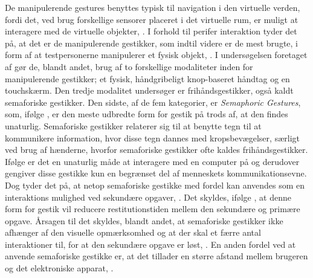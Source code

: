 De manipulerende gestures benyttes typisk til navigation i den virtuelle verden, fordi det, ved brug forskellige sensorer placeret i det virtuelle rum, er muligt at interagere med de virtuelle objekter, \parencite[ss. 14-15]{PDF:ATaxonomyOfGestures}. I forhold til perifer interaktion tyder det på, at det er de manipulerende gestikker, som indtil videre er de mest brugte, i form af at testpersonerne manipulerer et fysisk objekt, \parencite[s. 164]{PDF:ComparingInputModalities}. I undersøgelsen foretaget af \textcite[ss. 164-165]{PDF:ComparingInputModalities} gør de, blandt andet, brug af to forskellige modaliteter inden for manipulerende gestikker; et fysisk, håndgribeligt knop-baseret håndtag og en touchskærm. Den tredje modalitet \textcite[s. 165]{PDF:ComparingInputModalities} undersøger er frihåndsgestikker, også kaldt semaforiske gestikker.\blankline
%
Den sidste, af de fem kategorier, er \textit{Semaphoric Gestures}, som, ifølge \textcite[s. 6]{PDF:ATaxonomyOfGestures}, er den meste udbredte form for gestik på trods af, at den findes unaturlig. Semaforiske gestikker relaterer sig til at benytte tegn til at kommunikere information, hvor disse tegn dannes med kropsbevægelser, særligt ved brug af hænderne, hvorfor semaforiske gestikker ofte kaldes frihåndsgestikker. Ifølge \textcite[s. 1961]{PDF:AStudyOnTheUseOfSemaphoricGestures} er det en unaturlig måde at interagere med en computer på og derudover gengiver disse gestikke kun en begrænset del af menneskets kommunikationsevne. Dog tyder det på, at netop semaforiske gestikke med fordel kan anvendes som en interaktions mulighed ved sekundære opgaver, \parencite[s. 1961]{PDF:AStudyOnTheUseOfSemaphoricGestures}. Det skyldes, ifølge \textcite[s. 1964]{PDF:AStudyOnTheUseOfSemaphoricGestures}, at denne form for gestik vil reducere restitutionstiden mellem den sekundære og primære opgave. Årsagen til det skyldes, blandt andet, at semaforiske gestikker ikke afhænger af den visuelle opmærksomhed og at der skal et færre antal interaktioner til, for at den sekundære opgave er løst, \parencite[s. 1964]{PDF:AStudyOnTheUseOfSemaphoricGestures}. En anden fordel ved at anvende semaforiske gestikke er, at det tillader en større afstand mellem brugeren og det elektroniske apparat, \parencite[s. 6]{PDF:ATaxonomyOfGestures}.    

